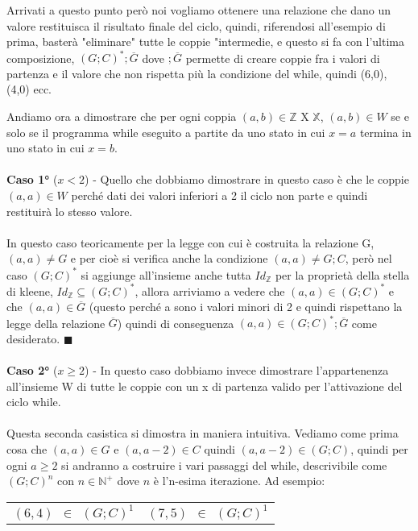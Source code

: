 Arrivati a questo punto però noi vogliamo ottenere una relazione che dano un valore restituisca il risultato finale del ciclo, quindi, riferendosi all'esempio di prima, basterà "eliminare" tutte le coppie "intermedie, e questo si fa con l'ultima composizione, $(G;C)^*;\overline{G}$ dove $;\overline{G}$ permette di creare coppie fra i valori di partenza e il valore che non rispetta più la condizione del while, quindi (6,0), (4,0) ecc.
\begin{demostration}
    Andiamo ora a dimostrare che per ogni coppia $(a,b) \in \mathbb{Z}$ X $\mathbb{X}$, $(a,b) \in W$ se e solo se il programma while eseguito a partite da uno stato in cui $x = a$ termina in uno stato in cui $x = b$. \\ \\
    \textbf{Caso 1°} (\underline{$x < 2$}) - Quello che dobbiamo dimostrare in questo caso è che le coppie $(a,a) \in W$ perché dati dei valori inferiori a 2 il ciclo non parte e quindi restituirà lo stesso valore.\\ \\ In questo caso teoricamente per la legge con cui è costruita la relazione G, $(a,a) \neq G$ e per cioè si verifica anche la condizione $(a,a)\neq G;C$, però nel caso $(G;C)^*$ si aggiunge all'insieme anche tutta $Id_{\mathbb{Z}}$ per la proprietà della stella di kleene, $Id_{\mathbb{Z}} \subseteq (G;C)^*$, allora arriviamo a vedere che $(a,a) \in (G;C)^*$ e che $(a,a) \in \overline{G}$ (questo perché a sono i valori minori di 2 e quindi rispettano la legge della relazione $\overline{G}$) quindi di conseguenza $(a,a) \in (G;C)^*;\overline{G}$ come desiderato. $\blacksquare$ \\ \\
    \textbf{Caso 2°} (\underline{$x \geq 2$}) - In questo caso dobbiamo invece dimostrare l'appartenenza all'insieme W di tutte le coppie con un x di partenza valido per l'attivazione del ciclo while.\\ \\
    Questa seconda casistica si dimostra in maniera intuitiva. Vediamo come prima cosa che $(a,a) \in G$ e $(a,a-2) \in C$ quindi $(a,a-2) \in (G;C)$, quindi per ogni $a \geq 2$ si andranno a costruire i vari passaggi del while, descrivibile come $(G;C)^n$ con $n \in \mathbb{N}^+$ dove $n$ è l'n-esima iterazione. Ad esempio:
    \begin{table}[h!]
        \centering
        \begin{tabular}{c c}
            $(6,4) \: \: \in \: \: (G;C)^1$ & $(7,5) \: \: \in \: \: (G;C)^1$  \\

\end{tabular}
\end{table}
\end{demostration}
